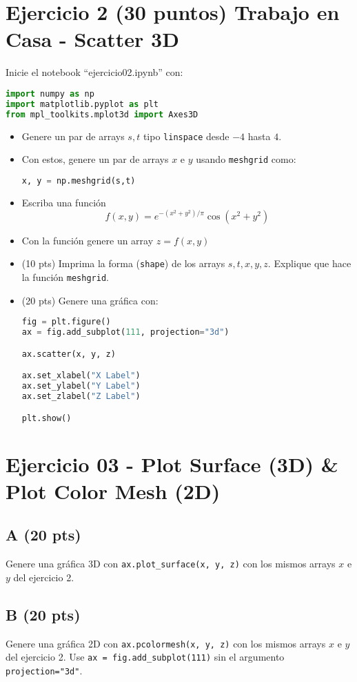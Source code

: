 \documentclass{article}
\begin{document}
\section{Ejercicio 2 (30 puntos) Trabajo en Casa - Scatter 3D}

Inicie el notebook ``ejercicio02.ipynb'' con:
\begin{lstlisting}[language=Python]
import numpy as np
import matplotlib.pyplot as plt
from mpl_toolkits.mplot3d import Axes3D
\end{lstlisting}

\begin{itemize}

\item Genere un par de arrays $s, t$  tipo \texttt{linspace} desde $-4$ hasta $4$.

\item Con estos, genere un par de arrays $x$ e $y$ usando \texttt{meshgrid} como:
\begin{lstlisting}[language=Python]
x, y = np.meshgrid(s,t)
\end{lstlisting}

\item Escriba una función
  \begin{equation}
    f(x,y) =  e^{-(x^2 + y^2)/\pi}  \cos (x^2 + y^2)
  \end{equation}
\item Con la función genere un array $z = f(x,y)$

\item (10 pts) Imprima la forma (\texttt{shape}) de los arrays $s, t, x, y, z$.
  Explique que hace la función \texttt{meshgrid}.
  
  
\item (20 pts) Genere una gráfica con:
\begin{lstlisting}[language=Python]
fig = plt.figure()
ax = fig.add_subplot(111, projection="3d")

ax.scatter(x, y, z)

ax.set_xlabel("X Label")
ax.set_ylabel("Y Label")
ax.set_zlabel("Z Label")

plt.show()
\end{lstlisting}
\end{itemize}



\section{Ejercicio 03 - Plot Surface (3D) \& Plot Color Mesh (2D)}

\subsection{A (20 pts)}
Genere una gráfica 3D con \texttt{ax.plot\_surface(x, y, z)} con los mismos arrays $x$ e $y$ del ejercicio 2.
\subsection{B (20 pts)}
Genere una gráfica 2D con \texttt{ax.pcolormesh(x, y, z)} con los mismos arrays $x$ e $y$ del ejercicio 2.
Use \texttt{ax = fig.add\_subplot(111)} sin el argumento \texttt{projection="3d"}.
\end{document}

